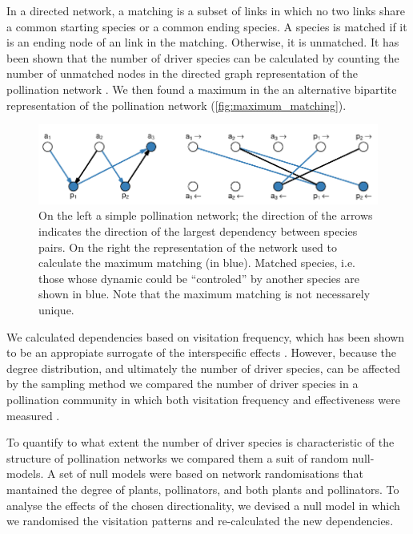 \documentclass[a4paper]{article}
\begin{document}
In a directed network, a matching is a subset of links in which no two links share a common starting species or a common ending species. A species is matched if it is an ending node of an link in the matching. Otherwise, it is unmatched. It has been shown that the number of driver species can be calculated by counting the number of unmatched nodes in the directed graph representation of the pollination network \autocite{Liu2011}. We then found a maximum in the an alternative bipartite representation of the pollination network \autocite{Csardi2006} (\autoref{fig:maximum_matching}). 

\begin{figure}
    \centering
    \includegraphics[width=\textwidth]{control_net}
    \caption{
    On the left a simple pollination network; the direction of the arrows indicates the direction of the largest dependency between species pairs. On the right the representation of the network used to calculate the maximum matching (in blue). Matched species, i.e. those whose dynamic could be ``controled'' by another species are shown in blue. Note that the maximum matching is not necessarely unique.
    }
    \label{fig:maximum_matching}
\end{figure} 

We calculated dependencies based on visitation frequency, which has been shown to be an appropiate surrogate of the interspecific effects \autocite{Bascompte2006, Vazquez2005}. However, because the degree distribution, and ultimately the number of driver species, can be affected by the sampling method \autocite{Bluthgen2010} we compared the number of driver species in a pollination community in which both visitation frequency and effectiveness were measured \autocite{Ballantyne2015}.

To quantify to what extent the number of driver species is characteristic of the structure of pollination networks we compared them a suit of random null-models. A set of null models were based on network randomisations that mantained the degree of plants, pollinators, and both plants and pollinators. To analyse the effects of the chosen directionality, we devised a null model in which we randomised the visitation patterns and re-calculated the new dependencies. 
\end{document}

